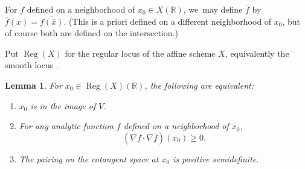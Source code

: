 \documentclass[JEP,XML,SOM,Unicode,NoFloatCountersInSection,published]{cedram}
\newenvironment{enumeratea}
{\bgroup\def\theenumi{\alph{enumi}}\def\theenumii{\roman{enumii}}\begin{enumerate}}
{\end{enumerate}\egroup}
\newtheorem{lem}[equation]{Lemma}
\theoremstyle{definition}
\newcommand{\stacklink}[1]{\href{https://stacks.math.columbia.edu/tag/#1}{#1}}
\newcommand{\stacks}[1]{\cite[Tag \stacklink{#1}]{stacks-project}}
\newcommand{\R}{\mathbb{R}}
\DeclareMathOperator{\Reg}{Reg}
\begin{document}
For $f$ defined on a neighborhood of $x_0\in X(\R)$, we~may define
$\bar{f}$ by $\bar{f}(x)=\overline{f(\bar{x})}$. (This is a priori defined on a different neighborhood of $x_0$, but of course both are
defined on the intersection.)

Put $\Reg(X)$ for the regular locus of the affine scheme $X$, equivalently the smooth locus \stacks{0B8X}.

\begin{lem} \label{RegX.lem}
For $x_0\in \Reg(X)(\R)$, the following are equivalent:
\begin{enumeratea}
\item \label{RegX.im} $x_0$ is in the image of $V$.
\item \label{RegX.pair} For any analytic function $f$ defined on a neighborhood of $x_0$,
\[
(\nabla f\cdot \nabla \bar{f})(x_0)\ge 0.
\]
\item \label{RegX.pos} The pairing on the cotangent space at $x_0$ is positive semidefinite.
\end{enumeratea}
\end{lem}
\end{document}
